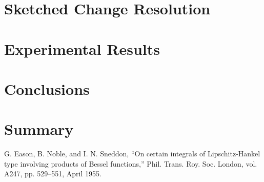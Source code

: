 \documentclass[10pt, conference]{IEEEtran}
\begin{document}
\section{Sketched Change Resolution}

\section{Experimental Results}

\section{Conclusions}

\section{Summary}

\begin{thebibliography}{00}
 G. Eason, B. Noble, and I. N. Sneddon, ``On certain integrals of Lipschitz-Hankel type involving products of Bessel functions,'' Phil. Trans. Roy. Soc. London, vol. A247, pp. 529--551, April 1955.
\end{thebibliography}
\end{document}

